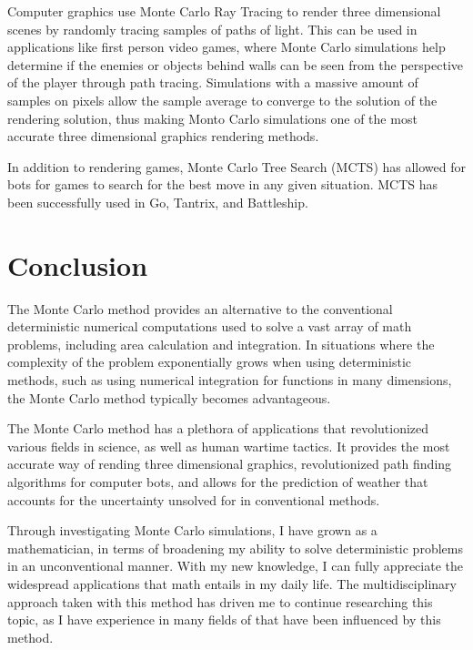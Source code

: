\documentclass[10pt, letterpaper]{article}
\begin{document}
  Computer graphics use Monte Carlo Ray Tracing to render three dimensional scenes by randomly tracing samples of paths of light. This can be
  used in applications like first person video games, where Monte Carlo simulations help determine if the enemies or objects behind walls
  can be seen from the perspective of the player through path tracing. Simulations with a massive amount of samples on pixels allow the sample
  average to converge to the solution of the rendering solution, thus making Monto Carlo simulations one of the most accurate three
  dimensional graphics rendering methods.

  In addition to rendering games, Monte Carlo Tree Search (MCTS) has allowed for bots for games to search for the best move in
  any given situation. MCTS has been successfully used in Go, Tantrix, and Battleship.

  \section{Conclusion}

  The Monte Carlo method provides an alternative to the conventional deterministic numerical computations used to solve a vast array of
  math problems, including area calculation and integration. In situations where the complexity of the problem exponentially grows when
  using deterministic methods, such as using numerical integration for functions in many dimensions, the Monte Carlo method typically
  becomes advantageous.

  The Monte Carlo method has a plethora of applications that revolutionized various fields in science, as well as human wartime tactics.
  It provides the most accurate way of rending three dimensional graphics, revolutionized path finding algorithms for computer bots, and
  allows for the prediction of weather that accounts for the uncertainty unsolved for in conventional methods.

  Through investigating Monte Carlo simulations, I have grown as a mathematician, in terms of broadening my ability to solve deterministic
  problems in an unconventional manner. With my new knowledge, I can fully appreciate the widespread applications that math entails in my daily
  life. The multidisciplinary approach taken with this method has driven me to continue researching this topic, as I have experience
  in many fields of that have been influenced by this method.
\end{document}

